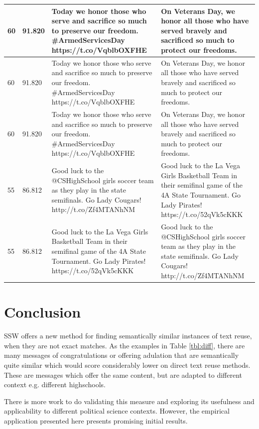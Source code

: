 \begin{table}[]
\begin{tabular}{|p{}|p{}|p{}|p{}|}
60       & 91.820                      & Today we honor those who serve and sacrifice so much to preserve our freedom. \#ArmedServicesDay https://t.co/VqblbOXFHE                                & On Veterans Day, we honor all those who have served bravely and sacrificed so much to protect our freedoms.                                         \\ \hline
60       & 91.820                      & Today we honor those who serve and sacrifice so much to preserve our freedom. \#ArmedServicesDay https://t.co/VqblbOXFHE                                & On Veterans Day, we honor all those who have served bravely and sacrificed so much to protect our freedoms.                                         \\ \hline
60       & 91.820                      & Today we honor those who serve and sacrifice so much to preserve our freedom. \#ArmedServicesDay https://t.co/VqblbOXFHE                                & On Veterans Day, we honor all those who have served bravely and sacrificed so much to protect our freedoms.                                         \\ \hline
55       & 86.812                      & Good luck to the @CSHighSchool girls soccer team as they play in the state semifinals. Go Lady Cougars! http://t.co/Zf4MTANhNM                          & Good luck to the La Vega Girls Basketball Team in their semifinal game of the 4A State Tournament. Go Lady Pirates! https://t.co/52qVk5cKKK         \\ \hline
55       & 86.812                      & Good luck to the La Vega Girls Basketball Team in their semifinal game of the 4A State Tournament. Go Lady Pirates! https://t.co/52qVk5cKKK             & Good luck to the @CSHighSchool girls soccer team as they play in the state semifinals. Go Lady Cougars! http://t.co/Zf4MTANhNM                      \\ \hline
\hline
\end{tabular}
\end{table}

\section{Conclusion}

SSW offers a new method for finding semantically similar instances of text reuse, when they are not exact matches. As the examples in Table \ref{tbl:diff}, there are many messages of congratulations or offering adulation that are semantically quite similar which would score considerably lower on direct text reuse methods. These are messages which offer the same content, but are adapted to different context e.g. different highschools.

There is more work to do validating this measure and exploring its usefulness and applicability to different political science contexts. However, the empirical application presented here presents promising initial results. 

